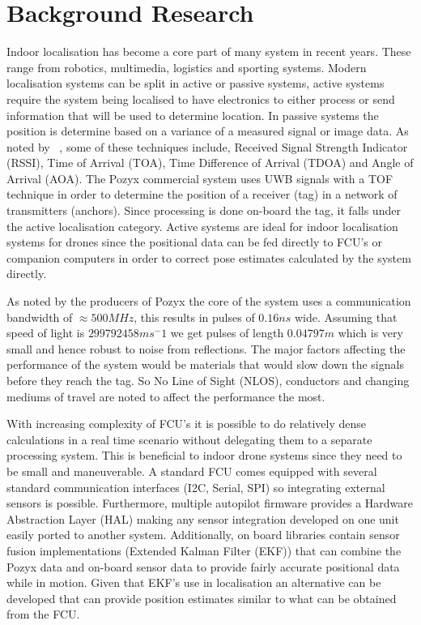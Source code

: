\section{Background Research}\label{sec:background}
Indoor localisation has become a core part of many system in recent years.
These range from robotics, multimedia, logistics and sporting systems.
Modern localisation systems can be split in active or passive systems, active systems require the system being localised to have electronics to either process or send information that will be used to determine location.
In passive systems the position is determine  based on a variance of a measured signal or image data.
As noted by ~\cite{deak2012survey}, some of these techniques include, Received Signal Strength Indicator (RSSI), Time of Arrival (TOA), Time Difference of Arrival (TDOA) and Angle of Arrival (AOA).
The Pozyx commercial system uses UWB signals with a TOF technique in order to determine the position of a receiver (tag) in a network of transmitters (anchors).
Since processing is done on-board the tag, it falls under the active localisation category.
Active systems are ideal for indoor localisation systems for drones since the positional data can be fed directly to FCU's or companion computers in order to correct pose estimates calculated by the system directly.

As noted by the producers of Pozyx the core of the system uses a communication bandwidth of $\approx 500M Hz$, this results in pulses of $0.16ns$ wide.
Assuming that speed of light is $299792458ms^-1$ we get pulses of length $0.04797m$ which is very small and hence robust to noise from reflections.
The major factors affecting the performance of the system would be materials that would slow down the signals before they reach the tag.
So No Line of Sight (NLOS), conductors and changing mediums of travel are noted to affect the performance the most.

With increasing complexity of FCU's it is possible to do relatively dense calculations in a real time scenario without delegating them to a separate processing system.
This is beneficial to indoor drone systems since they need to be small and maneuverable.
A standard FCU comes equipped with several standard communication interfaces (I2C, Serial, SPI) so integrating external sensors is possible.
Furthermore, multiple autopilot firmware provides a Hardware Abstraction Layer (HAL) making any sensor integration developed on one unit easily ported to another system.
Additionally, on board libraries contain sensor fusion implementations (Extended Kalman Filter (EKF)) that can combine the Pozyx data and on-board sensor data to provide fairly accurate positional data while in motion.
Given that EKF's use in localisation an alternative can be developed that can provide position estimates similar to what can be obtained from the FCU.